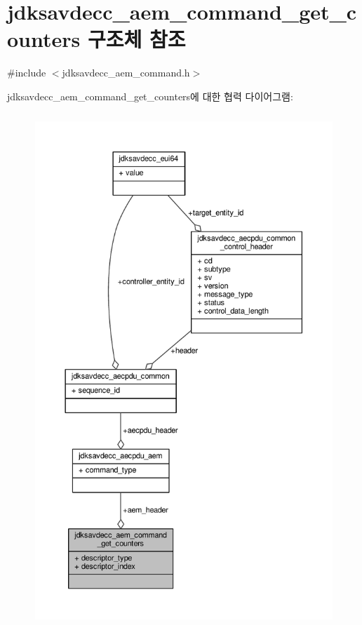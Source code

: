 \hypertarget{structjdksavdecc__aem__command__get__counters}{}\section{jdksavdecc\+\_\+aem\+\_\+command\+\_\+get\+\_\+counters 구조체 참조}
\label{structjdksavdecc__aem__command__get__counters}


{\ttfamily \#include $<$jdksavdecc\+\_\+aem\+\_\+command.\+h$>$}



jdksavdecc\+\_\+aem\+\_\+command\+\_\+get\+\_\+counters에 대한 협력 다이어그램\+:
\nopagebreak
\begin{figure}[H]
\begin{center}
\leavevmode
\includegraphics[height=550pt]{structjdksavdecc__aem__command__get__counters__coll__graph}
\end{center}
\end{figure}
